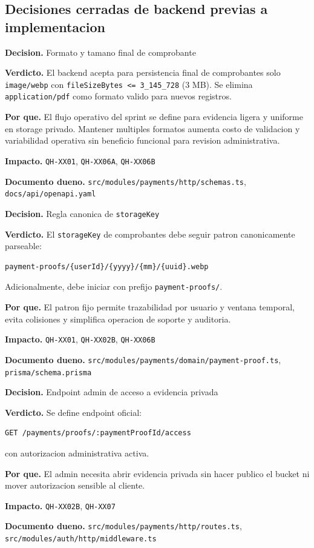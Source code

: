 \subsection{Decisiones cerradas de backend previas a implementacion}

\begin{docnote}
\textbf{Decision.} Formato y tamano final de comprobante

\textbf{Verdicto.} El backend acepta para persistencia final de comprobantes solo \texttt{image/webp} con \texttt{fileSizeBytes <= 3\_145\_728} (3 MB). Se elimina \texttt{application/pdf} como formato valido para nuevos registros.

\textbf{Por que.} El flujo operativo del sprint se define para evidencia ligera y uniforme en storage privado. Mantener multiples formatos aumenta costo de validacion y variabilidad operativa sin beneficio funcional para revision administrativa.

\textbf{Impacto.} \texttt{QH-XX01}, \texttt{QH-XX06A}, \texttt{QH-XX06B}

\textbf{Documento dueno.} \texttt{src/modules/payments/http/schemas.ts}, \texttt{docs/api/openapi.yaml}
\end{docnote}

\begin{docnote}
\textbf{Decision.} Regla canonica de \texttt{storageKey}

\textbf{Verdicto.} El \texttt{storageKey} de comprobantes debe seguir patron canonicamente parseable:
\begin{verbatim}
payment-proofs/{userId}/{yyyy}/{mm}/{uuid}.webp
\end{verbatim}
Adicionalmente, debe iniciar con prefijo \texttt{payment-proofs/}.

\textbf{Por que.} El patron fijo permite trazabilidad por usuario y ventana temporal, evita colisiones y simplifica operacion de soporte y auditoria.

\textbf{Impacto.} \texttt{QH-XX01}, \texttt{QH-XX02B}, \texttt{QH-XX06B}

\textbf{Documento dueno.} \texttt{src/modules/payments/domain/payment-proof.ts}, \texttt{prisma/schema.prisma}
\end{docnote}

\begin{docnote}
\textbf{Decision.} Endpoint admin de acceso a evidencia privada

\textbf{Verdicto.} Se define endpoint oficial:
\begin{verbatim}
GET /payments/proofs/:paymentProofId/access
\end{verbatim}
con autorizacion administrativa activa.

\textbf{Por que.} El admin necesita abrir evidencia privada sin hacer publico el bucket ni mover autorizacion sensible al cliente.

\textbf{Impacto.} \texttt{QH-XX02B}, \texttt{QH-XX07}

\textbf{Documento dueno.} \texttt{src/modules/payments/http/routes.ts}, \texttt{src/modules/auth/http/middleware.ts}
\end{docnote}

